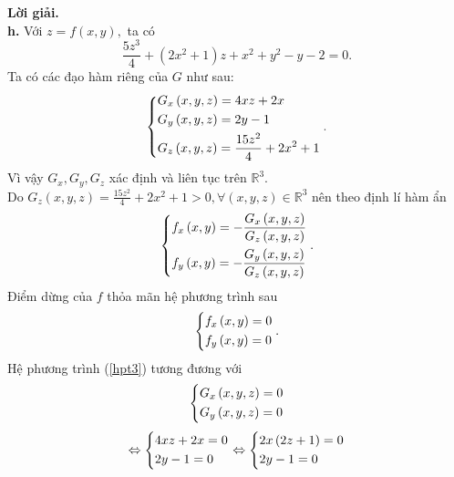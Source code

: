 \documentclass[12pt,a4paper]{article}
\begin{document}
\textbf{Lời giải.}\\
\textbf{h.} Với \(z = f \left( {x, y} \right),\) ta có
\begin{equation}
\frac{{5{z^3}}}{4} + \left( {2{x^2} + 1} \right)z + {x^2} + {y^2} - y - 2 = 0.
\label{eq3}
\end{equation}
Ta có các đạo hàm riêng của \(G\) như sau:
\[\left\{ \begin{gathered}
  {G_x}\left( {x,y,z} \right) = 4xz + 2x \hfill \\
  {G_y}\left( {x,y,z} \right) = 2y - 1 \hfill \\
  {G_z}\left( {x,y,z} \right) = \frac{{15{z^2}}}{4} + 2{x^2} + 1 \hfill \\ 
\end{gathered}  \right..\]
Vì vậy \(G_x, G_y, G_z\) xác định và liên tục trên \(\mathbb{R}^3.\)\\
Do \({G_z}\left( {x,y,z} \right) = \frac{{15{z^2}}}{4} + 2{x^2} + 1 > 0,\forall \left( {x,y,z} \right) \in {\mathbb{R}^3}\) nên theo định lí hàm ẩn
\[\left\{ \begin{gathered}
  {f_x}\left( {x,y} \right) =  - \frac{{{G_x}\left( {x,y,z} \right)}}{{{G_z}\left( {x,y,z} \right)}} \hfill \\
  {f_y}\left( {x,y} \right) =  - \frac{{{G_y}\left( {x,y,z} \right)}}{{{G_z}\left( {x,y,z} \right)}} \hfill \\ 
\end{gathered}  \right..\]
Điểm dừng của \(f\) thỏa mãn hệ phương trình sau
\begin{equation}
\left\{ \begin{gathered}
  {f_x}\left( {x,y} \right) = 0 \hfill \\
  {f_y}\left( {x,y} \right) = 0 \hfill \\ 
\end{gathered}  \right..
\label{hpt3}
\end{equation}
Hệ phương trình (\ref{hpt3}) tương đương với
\[\left\{ \begin{gathered}
  {G_x}\left( {x,y,z} \right) = 0 \hfill \\
  {G_y}\left( {x,y,z} \right) = 0 \hfill \\ 
\end{gathered}  \right.\]
\[ \Leftrightarrow \left\{ \begin{gathered}
  4xz + 2x = 0 \hfill \\
  2y - 1 = 0 \hfill \\ 
\end{gathered}  \right. \Leftrightarrow \left\{ \begin{gathered}
  2x\left( {2z + 1} \right) = 0 \hfill \\
  2y - 1 = 0 \hfill \\ 
\end{gathered}  \right.\]
\end{document}
